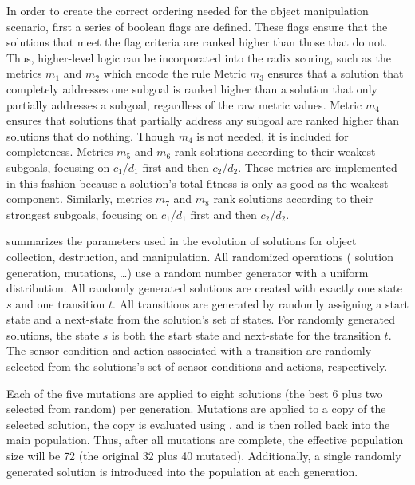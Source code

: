 In order to create the correct ordering needed for the object manipulation scenario, first a series of boolean flags are defined.  These flags ensure that the solutions that meet the flag criteria are ranked higher than those that do not.   Thus, higher-level logic can be incorporated into the radix scoring, such as the metrics $m_1$ and $m_2$ which encode the rule   Metric $m_3$ ensures that a solution that completely addresses one subgoal is ranked higher than a solution that only partially addresses a subgoal, regardless of the raw metric values.  Metric $m_4$ ensures that solutions that partially address any subgoal are ranked higher than solutions that do nothing.  Though $m_4$ is not needed, it is included for completeness. Metrics $m_5$ and $m_6$ rank solutions according to their weakest subgoals, focusing on $c_1$/$d_1$ first and then $c_2$/$d_2$.  These metrics are implemented in this fashion because a solution's total fitness is only as good as the weakest component.  Similarly, metrics $m_7$ and $m_8$ rank solutions according to their strongest subgoals, focusing on $c_1$/$d_1$ first and then $c_2$/$d_2$.

 summarizes the parameters used in the evolution of solutions for object collection, destruction, and manipulation.  All randomized operations (\ie{} solution generation, mutations, \ldots\@) use a random number generator with a uniform distribution.  All randomly generated solutions are created with exactly one state $s$ and one transition $t$.  All transitions are generated by randomly assigning a start state and a next-state from the solution's set of states.  For randomly generated solutions, the state $s$ is both the start state and next-state for the transition $t$.  The sensor condition and action associated with a transition are randomly selected from the solutions's set of sensor conditions and actions, respectively.  

Each of the five mutations are applied to eight solutions (the best 6 plus two selected from random) per generation.  Mutations are applied to a copy of the selected solution, the copy is evaluated using \SWEEP{}, and is then rolled back into the main population.  Thus, after all mutations are complete, the effective population size will be 72 (the original 32 plus 40 mutated).  Additionally, a single randomly generated solution is introduced into the population at each generation.

